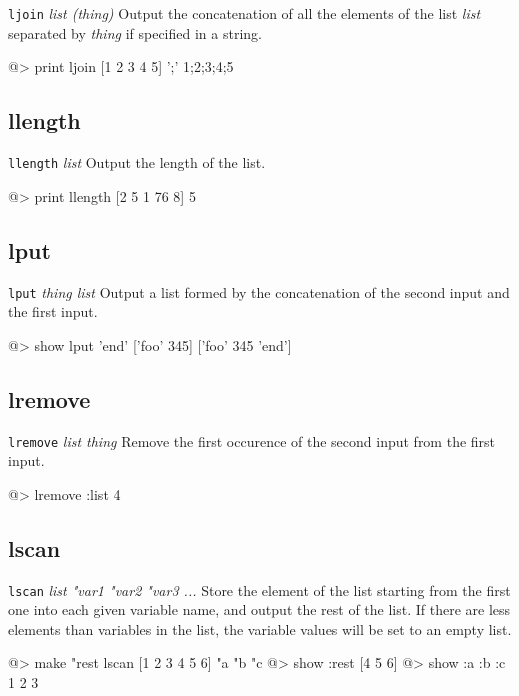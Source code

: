 {\tt ljoin} {\it list (thing)}
\newline\newline
Output the concatenation of all the elements of the list {\it list} separated by {\it thing} if specified in a string.
\begin{verbatimtab}
@> print ljoin [1 2 3 4 5] ';'
1;2;3;4;5
\end{verbatimtab}

\subsection*{llength}  
 
{\tt llength} {\it list} 
\newline\newline 
Output the length of the list.
\begin{verbatimtab} 
@> print llength [2 5 1 76 8]
5
\end{verbatimtab}

\subsection*{lput}  
 
{\tt lput} {\it thing list} 
\newline\newline 
Output a list formed by the concatenation of the second input and the first input.
\begin{verbatimtab} 
@> show lput 'end' ['foo' 345]
['foo' 345 'end']
\end{verbatimtab}
\cbstart
\subsection*{lremove}  
 
{\tt lremove} {\it list thing} 
\newline\newline 
Remove the first occurence of the second input from the first input.
\begin{verbatimtab} 
@> lremove :list 4
\end{verbatimtab} 
\cbend
\subsection*{lscan}  
 
{\tt lscan} {\it list "var1 "var2 "var3 ...} 
\newline\newline 
Store the element of the list starting from the first one into each given variable name, and output the rest of the list. If there are less
elements than variables in the list, the variable values will be set to an empty list.
\begin{verbatimtab} 
@> make "rest lscan [1 2 3 4 5 6] "a "b "c
@> show :rest
[4 5 6]
@> show :a :b :c
1 2 3
\end{verbatimtab} 

